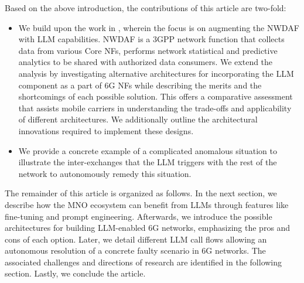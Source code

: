 Based on the above introduction, the contributions of this article are two-fold:
\begin{itemize}
    \item We build upon the work in \cite{Kan2024mobile_llama}, wherein the focus is on augmenting the \gls{NWDAF} with \gls{LLM} capabilities. \gls{NWDAF} is a \gls{3GPP} network function that collects data from various Core \glspl{NF}, performs network statistical and predictive analytics to be shared with authorized data consumers. We extend the analysis by investigating alternative architectures for incorporating the \gls{LLM} component as a part of 6G \glspl{NF} while describing the merits and the shortcomings of each possible solution. This offers a comparative assessment that assists mobile carriers in understanding the trade-offs and applicability of different architectures. We additionally outline the architectural innovations required to implement these designs.
    \item We provide a concrete example of a complicated anomalous situation to illustrate the inter-exchanges that the \gls{LLM} triggers with the rest of the network to autonomously remedy this situation. 
    \end{itemize}

The remainder of this article is organized as follows. In the next section, we describe how the \gls{MNO} ecosystem can benefit from \glspl{LLM} through features like fine-tuning and prompt engineering. Afterwards, we introduce the possible architectures for building \gls{LLM}-enabled 6G networks, emphasizing the pros and cons of each option. Later, we detail different \gls{LLM} call flows allowing an autonomous resolution of a concrete faulty scenario in 6G networks. The associated challenges and directions of research are identified in the following section. Lastly, we conclude the article.